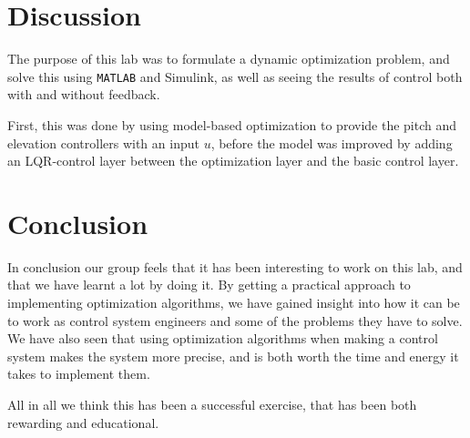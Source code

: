 \section{Discussion}
The purpose of this lab was to formulate a dynamic optimization problem, and solve this using \texttt{MATLAB} and Simulink, as well as seeing the results of control both with and without feedback.

First, this was done by using model-based optimization to provide the pitch and elevation controllers with an input $u$, before the model was improved by adding an LQR-control layer between the optimization layer and the basic control layer. 


\section{Conclusion}

In conclusion our group feels that it has been interesting to work on this lab, and that we have learnt a lot by doing it. By getting a practical approach to implementing optimization algorithms, we have gained insight into how it can be to work as control system engineers and some of the problems they have to solve. 
We have also seen that using optimization algorithms when making a control system makes the system more precise, and is both worth the time and energy it takes to implement them. 

All in all we think this has been a successful exercise, that has been both rewarding and educational.